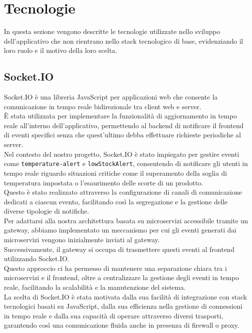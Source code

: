 \section{Tecnologie}

In questa sezione vengono descritte le tecnologie utilizzate nello sviluppo dell'applicativo che non rientrano nello stack tecnologico di base, evidenziando il loro ruolo e il motivo della loro scelta.

\subsection{Socket.IO}
Socket.IO è una libreria JavaScript per applicazioni web che consente la comunicazione in tempo reale bidirezionale tra client web e server\cite{socketio}.\\
È stata utilizzata per implementare la funzionalità di aggiornamento in tempo reale all'interno dell'applicativo, permettendo al backend
di notificare il frontend di eventi specifici senza che quest'ultimo debba effettuare richieste periodiche al server.\\
Nel contesto del nostro progetto, Socket.IO è stato impiegato per gestire eventi come \texttt{temperature-alert} e \texttt{lowStockAlert},
consentendo di notificare gli utenti in tempo reale riguardo situazioni critiche come il superamento della soglia di temperatura impostata o l'esaurimento delle scorte di un prodotto.\\
Questo è stato realizzato attraverso la configurazione di canali di comunicazione dedicati a ciascun evento, facilitando così la segregazione e la gestione delle diverse tipologie di notifiche.\\
Per adattarsi alla nostra architettura basata su microservizi accessibile tramite un gateway, abbiamo implementato un
meccanismo per cui gli eventi generati dai microservizi vengono inizialmente inviati al gateway.\\
Successivamente, il gateway si occupa di trasmettere questi eventi al frontend utilizzando Socket.IO.\\
Questo approccio ci ha permesso di mantenere una separazione chiara tra i microservizi e il frontend, oltre a
centralizzare la gestione degli eventi in tempo reale, facilitando la scalabilità e la manutenzione del sistema.\\
La scelta di Socket.IO è stata motivata dalla sua facilità di integrazione con stack tecnologici basati su JavaScript,
dalla sua efficienza nella gestione di connessioni in tempo reale e dalla sua capacità di operare attraverso diversi trasporti,
garantendo così una comunicazione fluida anche in presenza di firewall o proxy.\\

